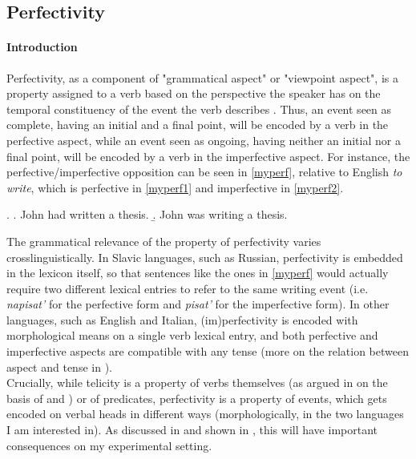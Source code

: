 \subsection{Perfectivity} 

\paragraph{Introduction}
Perfectivity, as a component of "grammatical aspect" or "viewpoint aspect", is a property assigned to a verb based on the perspective the speaker has on the temporal constituency of the event the verb describes \parencite{comrie1976aspect}. Thus, an event seen as complete, having an initial and a final point, will be encoded by a verb in the perfective aspect, while an event seen as ongoing, having neither an initial nor a final point, will be encoded by a verb in the imperfective aspect. For instance, the perfective/imperfective opposition can be seen in \ref{myperf}, relative to English \textit{to write}, which is perfective in \ref{myperf1} and imperfective in \ref{myperf2}.

\ex. \label{myperf} \a. \label{myperf1} John had written a thesis.
\b. \label{myperf2} John was writing a thesis.

The grammatical relevance of the property of perfectivity varies crosslinguistically. In Slavic languages, such as Russian, perfectivity is embedded in the lexicon itself, so that sentences like the ones in \ref{myperf} would actually require two different lexical entries to refer to the same writing event (i.e. \textit{napisat'} for the perfective form and \textit{pisat'} for the imperfective form). In other languages, such as English and Italian, (im)perfectivity is encoded with morphological means on a single verb lexical entry, and both perfective and imperfective aspects are compatible with any tense (more on the relation between aspect and tense in ).\\
Crucially, while telicity is a property of verbs themselves (as argued in  on the basis of \textcite{Olsen1997} and \textcite{Medina2007}) or of predicates, perfectivity is a property of events, which gets encoded on verbal heads in different ways (morphologically, in the two languages I am interested in). As discussed in  and shown in , this will have important consequences on my experimental setting.

